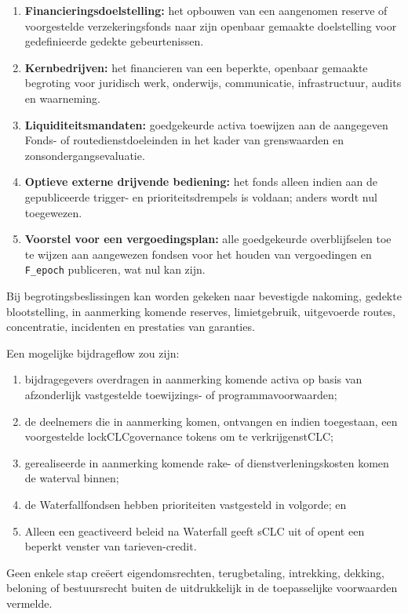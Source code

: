 \documentclass[11pt]{article}
\begin{document}
\begin{enumerate}[leftmargin=*]
\item \textbf{Financieringsdoelstelling:} het opbouwen van een aangenomen reserve of voorgestelde verzekeringsfonds naar zijn openbaar gemaakte doelstelling voor gedefinieerde gedekte gebeurtenissen.
\item \textbf{Kernbedrijven:} het financieren van een beperkte, openbaar gemaakte begroting voor juridisch werk, onderwijs, communicatie, infrastructuur, audits en waarneming.
\item \textbf{Liquiditeitsmandaten:} goedgekeurde activa toewijzen aan de aangegeven Fonds- of routedienstdoeleinden in het kader van grenswaarden en zonsondergangsevaluatie.
\item \textbf{Optieve externe drijvende bediening:} het fonds alleen indien aan de gepubliceerde trigger- en prioriteitsdrempels is voldaan; anders wordt nul toegewezen.
\item \textbf{Voorstel voor een vergoedingsplan:} alle goedgekeurde overblijfselen toe te wijzen aan aangewezen fondsen voor het houden van vergoedingen en \texttt{F\_epoch} publiceren, wat nul kan zijn.
\end{enumerate}
Bij begrotingsbeslissingen kan worden gekeken naar bevestigde nakoming, gedekte blootstelling, in aanmerking komende reserves, limietgebruik, uitgevoerde routes, concentratie, incidenten en prestaties van garanties.

Een mogelijke bijdrageflow zou zijn:

\begin{enumerate}[leftmargin=*]
\item bijdragegevers overdragen in aanmerking komende activa op basis van afzonderlijk vastgestelde toewijzings- of programmavoorwaarden;
\item de deelnemers die in aanmerking komen, ontvangen en indien toegestaan, een voorgestelde lockCLCgovernance tokens om te verkrijgenstCLC;
\item gerealiseerde in aanmerking komende rake- of dienstverleningskosten komen de waterval binnen;
\item de Waterfallfondsen hebben prioriteiten vastgesteld in volgorde; en
\item Alleen een geactiveerd beleid na Waterfall geeft sCLC uit of opent een beperkt venster van tarieven-credit.
\end{enumerate}
Geen enkele stap creëert eigendomsrechten, terugbetaling, intrekking, dekking, beloning of bestuursrecht buiten de uitdrukkelijk in de toepasselijke voorwaarden vermelde.
\end{document}

